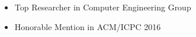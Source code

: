 \begin{minipage}{\maincolumnwidth}
{\begin{itemize}
    			\item {Top Researcher in Computer Engineering Group}%
                \item {Honorable Mention in ACM/ICPC 2016}%
		\end{itemize}}%
\end{minipage}%